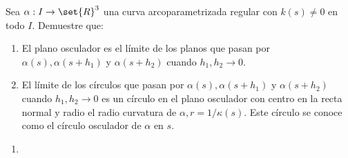 \documentclass{homework}
\begin{document}
\begin{prob}
    Sea \(\alpha:I\rightarrow\set{R}^3\) una curva arcoparametrizada regular con \(k(s)\neq0\) en todo \(I\). Demuestre que:
    \begin{enumerate}
        \item El plano osculador es el límite de los planos que pasan por \(\alpha(s),\alpha(s+h_1)\) y \(\alpha(s+h_2)\) cuando \(h_1,h_2\rightarrow0\).
        \item El límite de los círculos que pasan por \(\alpha(s),\alpha(s+h_1)\) y \(\alpha(s+h_2)\) cuando \(h_1,h_2\rightarrow0\) es un círculo en el plano osculador con centro en la recta normal y radio el radio curvatura de \(\alpha,r=1/\kappa(s)\). Este círculo se conoce como el círculo osculador de \(\alpha\) en \(s\).
    \end{enumerate}
\end{prob}

\begin{sol}
    \begin{enumerate}
        \item
    \end{enumerate}
\end{sol}
\end{document}
